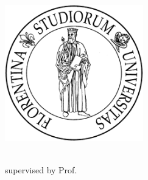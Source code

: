 \begin{titlepage}
	\begin{addmargin}[-1cm]{-3cm}
    \begin{center}
        \large  

        \hfill

        \vfill

        \begingroup
            \color{Maroon}\spacedallcaps{\myTitle} \\ \bigskip
        \endgroup

        \spacedlowsmallcaps{\myName}

        \vfill

        \includegraphics[width=6cm]{gfx/logo/unifi} \\ \medskip

        \mySubtitle \\ \medskip   
        supervised by Prof. \emph{\myProf}\\ \medskip
        \myFaculty \\
        \myUni \\ \bigskip

        \myTime

        \vfill                      

    \end{center}  
  \end{addmargin}       
\end{titlepage}   
